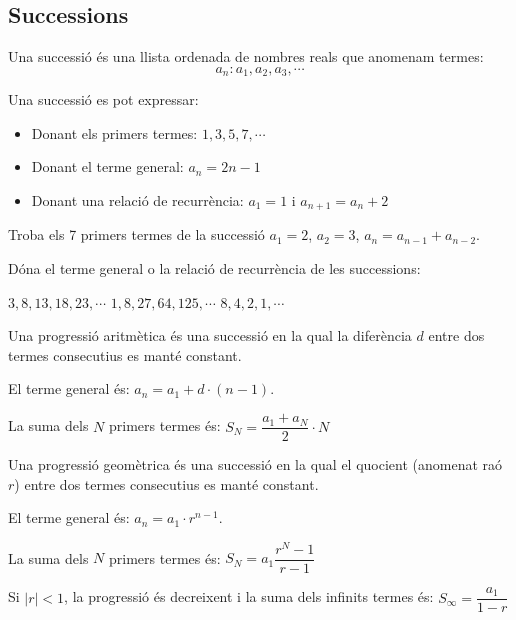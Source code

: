 \subsection{Successions}
\begin{theorybox}
	Una successió és una llista ordenada de nombres reals que anomenam termes:
	\[ a_n : a_1, a_2, a_3, \cdots \]
	
	Una successió es pot expressar:
	\begin{itemize}
		\item Donant els primers termes: $1, 3, 5, 7, \cdots$
		\item Donant el terme general: $a_n = 2n-1$
		\item Donant una relació de recurrència: $a_1 = 1$ i $a_{n+1}=a_n+2$
	\end{itemize}
\end{theorybox}

\begin{mylist}
\exer[1]	Troba els 7 primers termes de la successió $a_1=2$, $a_2=3$, $a_n=a_{n-1
	}+a_{n-2}$.	

\exer[1] Dóna el terme general o la relació de recurrència de les successions:
\begin{tasks}
	\task $3, 8, 13, 18, 23, \cdots$
	\task $1, 8, 27, 64, 125, \cdots$
	\task $8, 4, 2, 1, \cdots$
\end{tasks}

\answers{a) $a_n=3+5(n-1)$ o $a_1=3$ $a_n=a_{n-1}+3$ \par b) $a_n=n^3$ \par c) $a_n=8\cdot (1/2)^{n-1}$ o $a_1=8$ $a_n=a_{n-1}/2$]}
\end{mylist}

\begin{theorybox}
	Una progressió aritmètica és una successió en la qual la diferència $d$ entre dos termes consecutius es manté constant.
	
	El terme general és: $a_n = a_1 + d \cdot (n-1)$.
	
	La suma dels $N$ primers termes és: $S_N = \dfrac{a_1+a_N}{2} \cdot N$
\end{theorybox}
 

\begin{theorybox}
		Una progressió geomètrica és una successió en la qual el quocient (anomenat raó $r$)  entre dos termes consecutius es manté constant.
	
	El terme general és: $a_n = a_1 \cdot r^{n-1}$.
	
	La suma dels $N$ primers termes és: $S_N = a_1 \dfrac{r^N-1}{r-1}$
	
	Si $|r|<1$, la progressió és decreixent i la suma dels infinits termes és: $S_\infty = \dfrac{a_1}{1-r}$
\end{theorybox}

